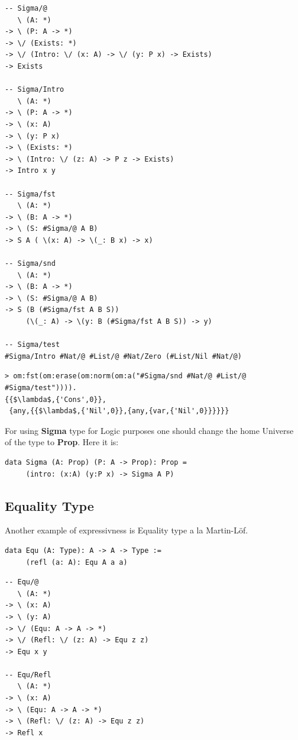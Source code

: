\documentclass[11pt,oneside]{article}
\begin{document}
\begin{lstlisting}[mathescape=true]
-- Sigma/@
   \ (A: *)
-> \ (P: A -> *)
-> \/ (Exists: *)
-> \/ (Intro: \/ (x: A) -> \/ (y: P x) -> Exists)
-> Exists

-- Sigma/Intro
   \ (A: *)
-> \ (P: A -> *)
-> \ (x: A)
-> \ (y: P x)
-> \ (Exists: *)
-> \ (Intro: \/ (z: A) -> P z -> Exists)
-> Intro x y

-- Sigma/fst
   \ (A: *)
-> \ (B: A -> *)
-> \ (S: #Sigma/@ A B)
-> S A ( \(x: A) -> \(_: B x) -> x)

-- Sigma/snd
   \ (A: *)
-> \ (B: A -> *)
-> \ (S: #Sigma/@ A B)
-> S (B (#Sigma/fst A B S))
     (\(_: A) -> \(y: B (#Sigma/fst A B S)) -> y)

-- Sigma/test
#Sigma/Intro #Nat/@ #List/@ #Nat/Zero (#List/Nil #Nat/@)
\end{lstlisting}

\begin{lstlisting}[mathescape=true]
> om:fst(om:erase(om:norm(om:a("#Sigma/snd #Nat/@ #List/@ #Sigma/test")))).
{{$\lambda$,{'Cons',0}},
 {any,{{$\lambda$,{'Nil',0}},{any,{var,{'Nil',0}}}}}}
\end{lstlisting}

For using {\bf Sigma} type for Logic purposes one should change the
home Universe of the type to {\bf Prop}. Here it is:

\begin{lstlisting}[mathescape=true]
data Sigma (A: Prop) (P: A -> Prop): Prop =
     (intro: (x:A) (y:P x) -> Sigma A P)
\end{lstlisting}

\newpage
\subsection{Equality Type}

Another example of expressivness is Equality type a la Martin-Löf.

\begin{lstlisting}[mathescape=true]
data Equ (A: Type): A -> A -> Type :=
     (refl (a: A): Equ A a a)
\end{lstlisting}

\begin{lstlisting}[mathescape=true]
-- Equ/@
   \ (A: *)
-> \ (x: A)
-> \ (y: A)
-> \/ (Equ: A -> A -> *)
-> \/ (Refl: \/ (z: A) -> Equ z z)
-> Equ x y

-- Equ/Refl
   \ (A: *)
-> \ (x: A)
-> \ (Equ: A -> A -> *)
-> \ (Refl: \/ (z: A) -> Equ z z)
-> Refl x
\end{lstlisting}
\end{document}
